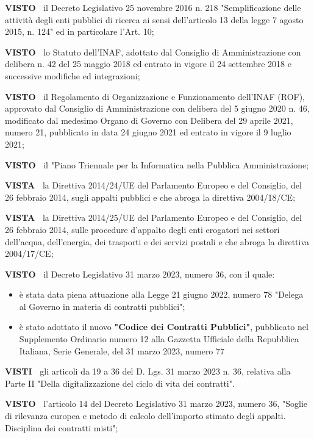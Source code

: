 \documentclass[a4paper,12pt]{letter}
\begin{document}
\textbf{VISTO~}	il Decreto Legislativo 25 novembre 2016 n. 218
"Semplificazione delle attività degli enti pubblici di ricerca ai
sensi dell’articolo 13 della legge 7 agosto 2015, n. 124" ed in
particolare l’Art. 10;

\textbf{VISTO~}	lo Statuto dell’INAF, adottato dal Consiglio di
Amministrazione con delibera n. 42 del 25 maggio 2018 ed entrato in
vigore il 24 settembre 2018 e successive modifiche ed integrazioni;

\textbf{VISTO~}	 il Regolamento di Organizzazione e Funzionamento
dell’INAF (ROF), approvato dal Consiglio di Amministrazione con delibera
del 5 giugno 2020 n. 46, modificato dal medesimo Organo di Governo con
Delibera del 29 aprile 2021, numero 21, pubblicato in data 24 giugno
2021 ed entrato in vigore il 9 luglio 2021;

\textbf{VISTO~}	il "Piano Triennale per la Informatica nella Pubblica
Amministrazione;

\textbf{VISTA~}	la Direttiva 2014/24/UE del Parlamento Europeo e del
Consiglio, del 26 febbraio 2014, sugli appalti pubblici e che abroga la
direttiva 2004/18/CE;  

\textbf{VISTA~}	la Direttiva 2014/25/UE del Parlamento Europeo e del
Consiglio, del 26 febbraio 2014, sulle procedure d'appalto degli enti
erogatori nei settori dell'acqua, dell'energia, dei trasporti e dei
servizi postali e che abroga la direttiva 2004/17/CE; 

\textbf{VISTO~}	il Decreto Legislativo 31 marzo 2023, numero 36, con il
quale:
\begin{itemize}

\item  è stata data piena attuazione alla Legge 21 giugno 2022,
numero 78 "Delega al Governo in materia di contratti pubblici";

\item è stato adottato il nuovo \textbf{"Codice dei Contratti Pubblici"},
    pubblicato nel Supplemento Ordinario numero 12 alla Gazzetta Ufficiale
    della Repubblica Italiana, Serie Generale, del 31 marzo 2023, numero 77
\end{itemize}

\textbf{VISTI~}	gli articoli da 19 a 36 del D. Lgs. 31 marzo 2023 n. 36,
relativa alla Parte II "Della digitalizzazione del ciclo di vita dei
contratti".

\textbf{VISTO~}                   l’articolo 14 del Decreto Legislativo
31 marzo 2023, numero 36, "Soglie di rilevanza    europea e metodo di
calcolo dell’importo stimato degli appalti. Disciplina dei contratti
misti"; 
\end{document}
